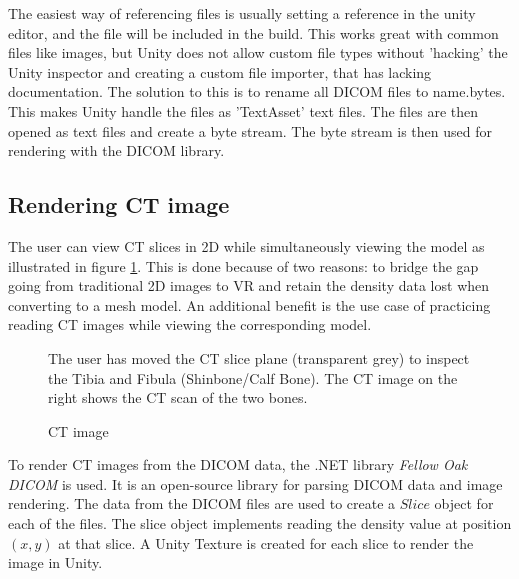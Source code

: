 \documentclass[a4paper]{report}
\begin{document}
The easiest way of referencing files is usually setting a reference in the unity editor, and the file will be included in the build. This works great with common files like images, but Unity does not allow custom file types without 'hacking' the Unity inspector and creating a custom file importer\cite{scriptedimporters_unity_nodate}, that has lacking documentation. The solution to this is to rename all DICOM files to {name}.bytes. This makes Unity handle the files as 'TextAsset' text files\cite{textassets_unity_nodate}. The files are then opened as text files and create a byte stream. The byte stream is then used for rendering with the DICOM library.

\subsection{Rendering CT image}

The user can view CT slices in 2D while simultaneously viewing the model as illustrated in figure \ref{ctscan}. This is done because of two reasons: to bridge the gap going from traditional 2D images to VR and retain the density data lost when converting to a mesh model. An additional benefit is the use case of practicing reading CT images while viewing the corresponding model.

\begin{figure}[h!]
    \centering
	\hfill
	\caption{CT image}\label{ctscan}
  \small

  The user has moved the CT slice plane (transparent grey) to inspect the Tibia and Fibula (Shinbone/Calf Bone). The CT image on the right shows the CT scan of the two bones.
~\cite{mishra_virtual_2019}
\end{figure}
To render CT images from the DICOM data, the .NET library \emph{Fellow Oak DICOM}\cite{noauthor_fellow_2022} is used. It is an open-source library for parsing DICOM data and image rendering.
The data from the DICOM files are used to create a $Slice$ object for each of the files. The slice object implements reading the density value at position $(x, y)$ at that slice. A Unity Texture is created for each slice to render the image in Unity.
\end{document}
